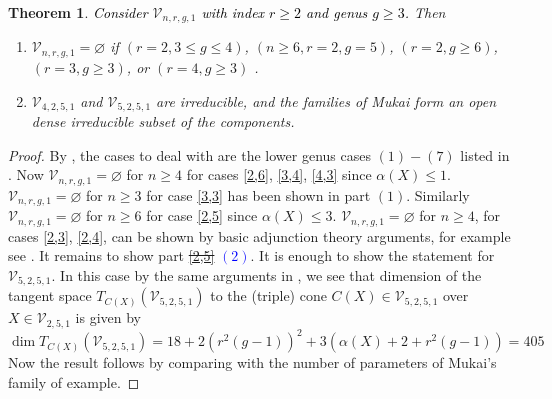 \documentclass[11pt,twoside]{amsart}
\theoremstyle{plain}
\numberwithin{equation}{section}
\newtheorem{theorem}{Theorem}[section]
\theoremstyle{definition}
\begin{document}
\color{black}

\begin{theorem}\label{classification of Mukai varieties with index two}
\textcolor{black}{Consider} $\mathcal{V}_{n,r,g,1}$ \textcolor{black}{with index $r \geq 2$ and genus $g \geq 3$.} Then 
\begin{enumerate}
    \item $\mathcal{V}_{n,r,g,1} = \varnothing$ if $(r = 2, 3 \leq g \leq 4)$, $(n \geq 6, r = 2, g = 5)$, $(r = 2, g \geq 6)$, $(r = 3, g \geq 3)$, or $(r = 4, g \geq 3)$ . 
    \item $\mathcal{V}_{4,2,5,1}$ and $\mathcal{V}_{5,2,5,1}$ are irreducible, and the families of Mukai form an open dense irreducible subset of the components.
\end{enumerate}
\end{theorem}

\begin{proof}
   By , the cases to deal with are the lower genus cases $(1)-(7)$  listed in \sout{} \textcolor{blue}{}. Now $\mathcal{V}_{n,r,g,1} = \varnothing$ for $n \geq 4$ for cases \ref{2,6}, \ref{3,4}, \ref{4,3} since $\alpha(X) \leq 1$. $\mathcal{V}_{n,r,g,1} = \varnothing$ for $n \geq 3$ for case \ref{3,3} has been shown in  part $(1)$. Similarly $\mathcal{V}_{n,r,g,1} = \varnothing$ for $n \geq 6$ for case \ref{2,5} since $\alpha(X) \leq 3$.  $\mathcal{V}_{n,r,g,1} = \varnothing$ for $n \geq 4$, for cases \ref{2,3}, \ref{2,4}, can be shown by basic adjunction theory arguments, for example see \cite[\sout{Theorem $3.11$} \textcolor{blue}{Theorem $3.15$}]{CLM98}. It remains to show part \sout{\ref{2,5}} \textcolor{blue}{$(2)$}. It is enough to show the statement for $\mathcal{V}_{5,2,5,1}$. In this case by the same arguments in , we see that dimension of the tangent space $T_{C(X)}(\mathcal{V}_{5,2,5,1})$ to the (triple) cone $C(X) \in \mathcal{V}_{5,2,5,1}$ over $X \in \mathcal{V}_{2,5,1}$ is given by 
   $$\operatorname{dim}T_{C(X)}(\mathcal{V}_{5,2,5,1}) = 18+2(r^2(g-1))^2+3(\alpha(X)+2+r^2(g-1)) = 405$$
   Now the result follows by comparing with the number of parameters of Mukai's family of example.


\end{proof}
\end{document}
